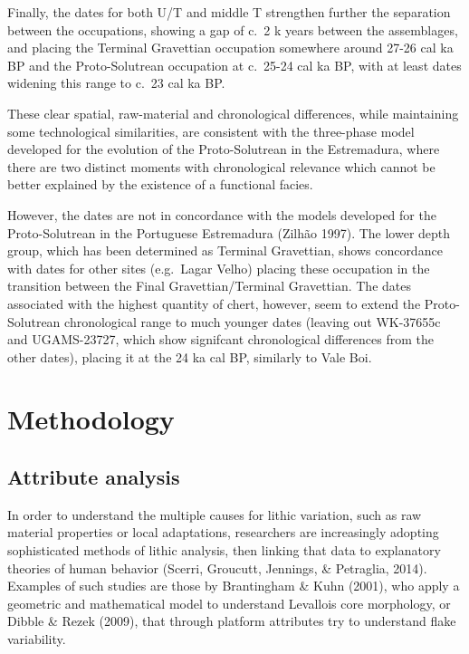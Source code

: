 \documentclass[12pt,twoside]{reedthesis}
\begin{document}
Finally, the dates for both U/T and middle T strengthen further the separation between the occupations, showing a gap of c.~2 k years between the assemblages, and placing the Terminal Gravettian occupation somewhere around 27-26 cal ka BP and the Proto-Solutrean occupation at c.~25-24 cal ka BP, with at least dates widening this range to c.~23 cal ka BP.

These clear spatial, raw-material and chronological differences, while maintaining some technological similarities, are consistent with the three-phase model developed for the evolution of the Proto-Solutrean in the Estremadura, where there are two distinct moments with chronological relevance which cannot be better explained by the existence of a functional facies.

However, the dates are not in concordance with the models developed for the Proto-Solutrean in the Portuguese Estremadura (Zilhão 1997). The lower depth group, which has been determined as Terminal Gravettian, shows concordance with dates for other sites (e.g.~Lagar Velho) placing these occupation in the transition between the Final Gravettian/Terminal Gravettian. The dates associated with the highest quantity of chert, however, seem to extend the Proto-Solutrean chronological range to much younger dates (leaving out WK-37655c and UGAMS-23727, which show signifcant chronological differences from the other dates), placing it at the 24 ka cal BP, similarly to Vale Boi.

\hypertarget{methodology}{%
\chapter{Methodology}\label{methodology}}

\hypertarget{attribute-analysis}{%
\section{Attribute analysis}\label{attribute-analysis}}

In order to understand the multiple causes for lithic variation, such as raw material properties or local adaptations, researchers are increasingly adopting sophisticated methods of lithic analysis, then linking that data to explanatory theories of human behavior (Scerri, Groucutt, Jennings, \& Petraglia, 2014). Examples of such studies are those by Brantingham \& Kuhn (2001), who apply a geometric and mathematical model to understand Levallois core morphology, or Dibble \& Rezek (2009), that through platform attributes try to understand flake variability.
\end{document}
